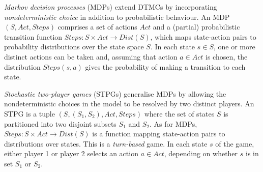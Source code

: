 \documentclass{llncs}
\begin{document}
\emph{Markov decision processes} (MDPs) extend DTMCs by incorporating \emph{nondeterministic choice}
in addition to probabilistic behaviour.
An MDP $(S,Act,Steps)$ comprises a set of actions $Act$
and a (partial) probabilistic transition function $Steps:S\times Act\rightarrow Dist(S)$,
which maps state-action pairs to probability distributions over the state space $S$.
In each state $s\in S$, one or more distinct actions can be taken and, assuming that action $a\in Act$ is chosen,
the distribution $Steps(s,a)$ gives the probability of making a transition to each state.



\emph{Stochastic two-player games} (STPGs) generalise MDPs by allowing the nondeterministic choices
in the model to be resolved by two distinct players.
An STPG is a tuple $(S,(S_1,S_2),Act,Steps)$
where the set of states $S$ is partitioned into two disjoint subsets $S_1$ and $S_2$.
As for MDPs, $Steps:S\times Act\rightarrow Dist(S)$ is a function mapping
state-action pairs to distributions over states.
This is a \emph{turn-based} game. In each state $s$ of the game,
either player 1 or player 2 selects an action $a\in Act$,
depending on whether $s$ is in set $S_1$ or $S_2$.
\end{document}
